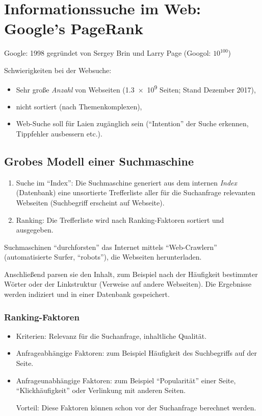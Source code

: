 \chapter{Informationssuche im Web: Google's PageRank}
Google: 1998 gegründet von Sergey Brin und Larry Page (Googol: $10^{100}$)

Schwierigkeiten bei der Websuche:
\begin{itemize}
\item Sehr große \emph{Anzahl} von Webseiten (\num{1.3e9} Seiten; Stand Dezember
  2017),
\item nicht sortiert (nach Themenkomplexen),
\item Web-Suche soll für Laien zugänglich sein (``Intention'' der Suche
  erkennen, Tippfehler ausbessern etc.).
\end{itemize}

\section{Grobes Modell einer Suchmaschine}
\begin{enumerate}
\item Suche im ``Index'': Die Suchmaschine generiert aus dem internen
  \emph{Index} (Datenbank) eine unsortierte Trefferliste aller für die
  Suchanfrage relevanten Webseiten (Suchbegriff erscheint auf Webseite).
\item Ranking: Die Trefferliste wird nach Ranking-Faktoren sortiert und
  ausgegeben.
\end{enumerate}

Suchmaschinen ``durchforsten'' das Internet mittels ``Web-Crawlern''
(automatisierte Surfer, ``robots''), die Webseiten herunterladen.

Anschließend parsen sie den Inhalt, zum Beispiel nach der Häufigkeit bestimmter
Wörter oder der Linkstruktur (Verweise auf andere Webseiten). Die Ergebnisse
werden indiziert und in einer Datenbank gespeichert.

\subsection*{Ranking-Faktoren}
\begin{itemize}
\item Kriterien: Relevanz für die Suchanfrage, inhaltliche Qualität.
\item Anfrageabhängige Faktoren: zum Beispiel Häufigkeit des Suchbegriffs auf
  der Seite.
\item Anfrageunabhängige Faktoren: zum Beispiel ``Popularität'' einer Seite,
  ``Klickhäu\-fig\-keit'' oder Verlinkung mit anderen Seiten.

  Vorteil: Diese Faktoren können schon vor der Suchanfrage berechnet werden.
\end{itemize}

